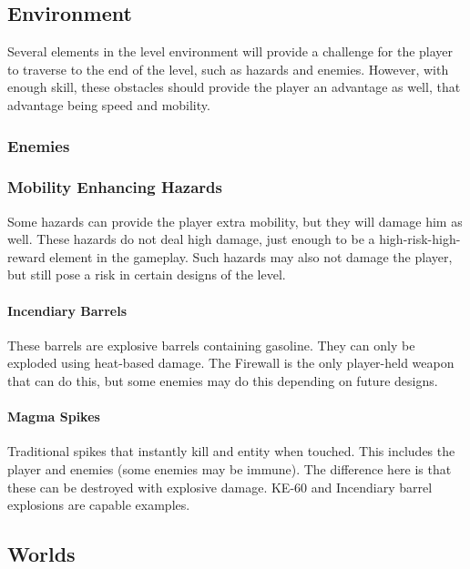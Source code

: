 \documentclass[12pt]{article}
\begin{document}
\subsection{Environment}

Several elements in the level environment will provide a challenge for the player to traverse to the end of the level, such as hazards and enemies. However, with enough skill, these obstacles should provide the player an advantage as well, that advantage being speed and mobility. 

\subsubsection{Enemies}

\subsubsection{Mobility Enhancing Hazards}

Some hazards can provide the player extra mobility, but they will damage him as well. These hazards do not deal high damage, just enough to be a high-risk-high-reward element in the gameplay. Such hazards may also not damage the player, but still pose a risk in certain designs of the level. 

\paragraph{Incendiary Barrels} 

These barrels are explosive barrels containing gasoline. They can only be exploded using heat-based damage. The Firewall is the only player-held weapon that can do this, but some enemies may do this depending on future designs. 

\paragraph{Magma Spikes}

Traditional spikes that instantly kill and entity when touched. This includes the player and enemies (some enemies may be immune). The difference here is that these can be destroyed with explosive damage. KE-60 and Incendiary barrel explosions are capable examples. 

\subsection{Worlds}
\end{document}

